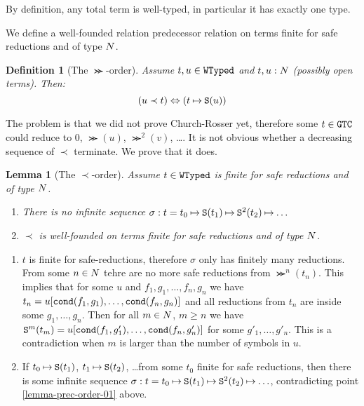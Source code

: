 \documentclass{article}
\newtheorem{lemma}[theorem]{Lemma}
\newtheorem{definition}[theorem]{Definition}
\newenvironment{proof}[1][Proof]{\begin{trivlist}
\item[\hskip \labelsep {\bfseries #1}]}{\end{trivlist}}
\begin{document}
By definition, any total term is well-typed, in particular it has exactly one type. 

We define a well-founded relation predecessor relation on terms finite for safe reductions and of type ${N}$.

\begin{definition}[The $\Succ$-order]
Assume $t, u \in {\tt WTyped}$ and $t, u :{N}$ (possibly open terms).
Then:
$$
(u \prec t) \Leftrightarrow (t \mathbin{\mapsto} {\tt S}(u))
$$
\end{definition}

The problem is that we did not prove Church-Rosser yet, therefore some $t \in {\tt GTC}$ could reduce to 
$0$, $\Succ(u)$, $\Succ^2(v)$, \ldots.
It is not obvious whether a decreasing sequence of $\prec$ terminate. We prove that it does.


\begin{lemma}[The $\prec$-order]
\label{lemma-prec-order}
Assume $t \in {\tt WTyped}$ is finite for safe reductions and of type ${N}$.

\begin{enumerate}
\item
\label{lemma-prec-order-01}
There is no infinite sequence 
$\sigma: t = t_0 \mathbin{\mapsto} {\tt S}(t_1) \mathbin{\mapsto} {\tt S}^2(t_2) \mathbin{\mapsto} \ldots$

\item
\label{lemma-prec-order-02}
$\prec$ is well-founded on terms finite for safe reductions and of type ${N}$.
\end{enumerate}
\end{lemma}


\begin{proof}
\begin{enumerate}
\item
$t$ is finite for safe-reductions, therefore
$\sigma$ only has finitely many reductions. From some $n\in{N}$ tehre are no more safe reductions from
$\Succ^n(t_n)$. This implies that for some $u$ and $f_1, g_1, \ldots, f_n, g_n$ we have
$t_n = u[{\tt cond}(f_1,g_1), \ldots, {\tt cond}(f_n,g_n)]$ and all reductions from $t_n$ are inside
some $g_1, \ldots, g_n$. Then for all $m \in {N}$, $m \ge n$ we  have
${\tt S}^{m}(t_{m}) =  u[{\tt cond}(f_1,g'_1), \ldots, {\tt cond}(f_n,g'_n)]$ for some 
$g'_1, \ldots, g'_n$. This is a contradiction when $m$ is larger than the number of symbols in $u$.

\item
If $t_0 \mathbin{\mapsto} {\tt S}(t_1)$, $t_1 \mathbin{\mapsto} {\tt S}(t_2)$, \ldots from some $t_0$ finite for safe reductions,
then there is some infinite sequence 
$\sigma: t = t_0 \mathbin{\mapsto} {\tt S}(t_1) \mathbin{\mapsto} {\tt S}^2(t_2) \mathbin{\mapsto} \ldots$,
contradicting point \ref{lemma-prec-order-01} above.
\end{enumerate}
\end{proof}
\end{document}

